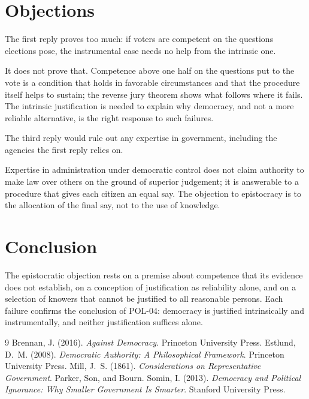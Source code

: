 \documentclass{situationist-preprint}
\begin{document}
\section{Objections}

\begin{objection}
The first reply proves too much: if voters are competent on the questions elections pose, the instrumental case needs no help from the intrinsic one.
\end{objection}

\begin{reply}
It does not prove that. Competence above one half on the questions put to the vote is a condition that holds in favorable circumstances and that the procedure itself helps to sustain; the reverse jury theorem shows what follows where it fails. The intrinsic justification is needed to explain why democracy, and not a more reliable alternative, is the right response to such failures.
\end{reply}

\begin{objection}
The third reply would rule out any expertise in government, including the agencies the first reply relies on.
\end{objection}

\begin{reply}
Expertise in administration under democratic control does not claim authority to make law over others on the ground of superior judgement; it is answerable to a procedure that gives each citizen an equal say. The objection to epistocracy is to the allocation of the final say, not to the use of knowledge.
\end{reply}

\section{Conclusion}

The epistocratic objection rests on a premise about competence that its evidence does not establish, on a conception of justification as reliability alone, and on a selection of knowers that cannot be justified to all reasonable persons. Each failure confirms the conclusion of POL-04: democracy is justified intrinsically and instrumentally, and neither justification suffices alone.

\begin{thebibliography}{9}
 Brennan, J. (2016). \emph{Against Democracy}. Princeton University Press.
 Estlund, D.~M. (2008). \emph{Democratic Authority: A Philosophical Framework}. Princeton University Press.
 Mill, J.~S. (1861). \emph{Considerations on Representative Government}. Parker, Son, and Bourn.
 Somin, I. (2013). \emph{Democracy and Political Ignorance: Why Smaller Government Is Smarter}. Stanford University Press.
\end{thebibliography}
\end{document}
